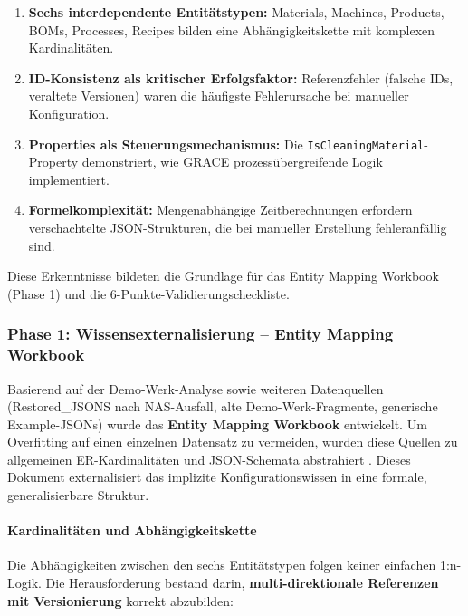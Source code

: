 \begin{enumerate}
    \item \textbf{Sechs interdependente Entitätstypen:} Materials, Machines, Products, BOMs, Processes, Recipes bilden eine Abhängigkeitskette mit komplexen Kardinalitäten.

    \item \textbf{ID-Konsistenz als kritischer Erfolgsfaktor:} Referenzfehler (falsche IDs, veraltete Versionen) waren die häufigste Fehlerursache bei manueller Konfiguration.

    \item \textbf{Properties als Steuerungsmechanismus:} Die \texttt{IsCleaningMaterial}-Property demonstriert, wie GRACE prozessübergreifende Logik implementiert.

    \item \textbf{Formelkomplexität:} Mengenabhängige Zeitberechnungen erfordern verschachtelte JSON-Strukturen, die bei manueller Erstellung fehleranfällig sind.
\end{enumerate}

Diese Erkenntnisse bildeten die Grundlage für das Entity Mapping Workbook (Phase 1) und die 6-Punkte-Validierungscheckliste.


\subsubsection{Phase 1: Wissensexternalisierung -- Entity Mapping Workbook}
\label{subsubsec:Phase1}

Basierend auf der Demo-Werk-Analyse sowie weiteren Datenquellen (Restored\_JSONS nach NAS-Ausfall, alte Demo-Werk-Fragmente, generische Example-JSONs) wurde das \textbf{Entity Mapping Workbook} entwickelt. Um Overfitting auf einen einzelnen Datensatz zu vermeiden, wurden diese Quellen zu allgemeinen ER-Kardinalitäten und JSON-Schemata abstrahiert \citep{mayring:qualitative2015}. Dieses Dokument externalisiert das implizite Konfigurationswissen in eine formale, generalisierbare Struktur.

\paragraph{Kardinalitäten und Abhängigkeitskette}

Die Abhängigkeiten zwischen den sechs Entitätstypen folgen keiner einfachen 1:n-Logik. Die Herausforderung bestand darin, \textbf{multi-direktionale Referenzen mit Versionierung} korrekt abzubilden:

